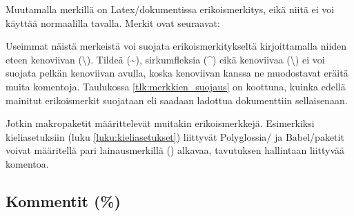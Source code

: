 Muutamalla merkillä on Latex\-/dokumentissa erikoismerkitys, eikä niitä
ei voi käyttää normaalilla tavalla. Merkit ovat seuraavat:

\begin{koodilohkosis}
\end{koodilohkosis}

Useimmat näistä merkeistä voi suojata erikoismerkitykseltä
kirjoittamalla niiden eteen kenoviivan (\textbackslash). Tildeä
(\textasciitilde), sirkumfleksia (\textasciicircum) eikä kenoviivaa
(\textbackslash) ei voi suojata pelkän kenoviivan avulla, koska
kenoviivan kanssa ne muodostavat eräitä muita komentoja. Taulukossa
\ref{tlk:merkkien_suojaus} on koottuna, kuinka edellä mainitut
erikoismerkit suojataan eli saadaan ladottua dokumenttiin sellaisenaan.


Jotkin makropaketit määrittelevät muitakin erikoismerkkejä. Esimerkiksi
kieli\-asetuksiin (luku \ref{luku:kieliasetukset}) liittyvät
Polyglossia\-/{} ja Babel\-/paketit voivat määritellä pari
lainausmerkillä (\textquotedbl) alkavaa, tavutuksen hallintaan liittyvää
komentoa.

\subsection{Kommentit (\%)}


